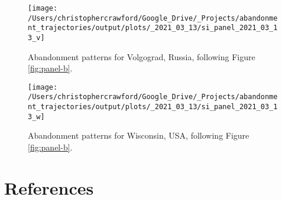 \documentclass[9pt,lineno]{pnas-new}
\begin{document}
\begin{figure}
\texttt{[image: /Users/christophercrawford/Google\_Drive/\_Projects/abandonment\_trajectories/output/plots/\_2021\_03\_13/si\_panel\_2021\_03\_13\_v]} \caption{Abandonment patterns for Volgograd, Russia, following Figure \ref{fig:panel-b}.}\label{fig:panel-v}
\end{figure}

\begin{figure}
\texttt{[image: /Users/christophercrawford/Google\_Drive/\_Projects/abandonment\_trajectories/output/plots/\_2021\_03\_13/si\_panel\_2021\_03\_13\_w]} \caption{Abandonment patterns for Wisconsin, USA, following Figure \ref{fig:panel-b}.}\label{fig:panel-w}
\end{figure}

\pnasbreak

\newpage

\hypertarget{references}{%
\section*{References}\label{references}}
\end{document}
